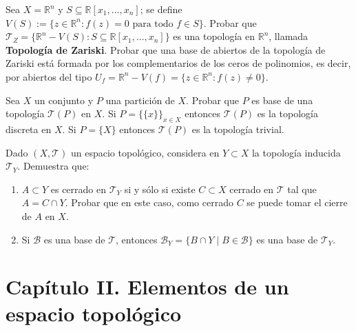 \begin{ejer}[35]
Sea $X = \mathbb{R}^n$ y $S \subseteq \mathbb{R}[x_1, \dots, x_n]$; se define $V(S) := \{z \in \mathbb{R}^n : f(z) = 0 \text{ para todo } f \in S\}$. Probar que $\mathcal{T}_Z = \{\mathbb{R}^n - V(S) : S \subseteq \mathbb{R}[x_1, \dots, x_n]\}$ es una topología en $\mathbb{R}^n$, llamada \textbf{Topología de Zariski}. Probar que una base de abiertos de la topología de Zariski está formada por los complementarios de los ceros de polinomios, es decir, por abiertos del tipo $U_f = \mathbb{R}^n - V(f) = \{z \in \mathbb{R}^n : f(z) \neq 0\}$.
\end{ejer}

\begin{ejer}[36]
Sea $X$ un conjunto y $P$ una partición de $X$. Probar que $P$ es base de una topología $\mathcal{T}(P)$ en $X$. Si $P = \{\{x\}\}_{x \in X}$ entonces $\mathcal{T}(P)$ es la topología discreta en $X$. Si $P = \{X\}$ entonces $\mathcal{T}(P)$ es la topología trivial.
\end{ejer}

\begin{ejer}[37]
Dado $(X, \mathcal{T})$ un espacio topológico, considera en $Y \subset X$ la topología inducida $\mathcal{T}_Y$. Demuestra que:
\begin{enumerate}
    \item[a)] $A \subset Y$ es cerrado en $\mathcal{T}_Y$ si y sólo si existe $C \subset X$ cerrado en $\mathcal{T}$ tal que $A = C \cap Y$. Probar que en este caso, como cerrado $C$ se puede tomar el cierre de $A$ en $X$.
    \item[b)] Si $\mathcal{B}$ es una base de $\mathcal{T}$, entonces $\mathcal{B}_Y = \{B \cap Y \mid B \in \mathcal{B}\}$ es una base de $\mathcal{T}_Y$.
\end{enumerate}
\end{ejer}

\section*{Capítulo II. Elementos de un espacio topológico}

